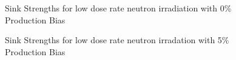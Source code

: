 \documentclass[a4paper]{article}
\begin{document}
\begin{figure}[h!]
        \caption{Sink Strengths for low dose rate neutron irradiation with 0\% Production Bias}
        \label{figure:sink_strengths_neutron_0_1e-6}
      \end{figure}
      \begin{figure}[h!]  %
        \centering
        \qquad
        \caption{Sink Strengths for low dose rate neutron irradation with 5\% Production Bias}
        \label{figure:sink_strengths_neutron_5_1e-6}
      \end{figure}
\end{document}

